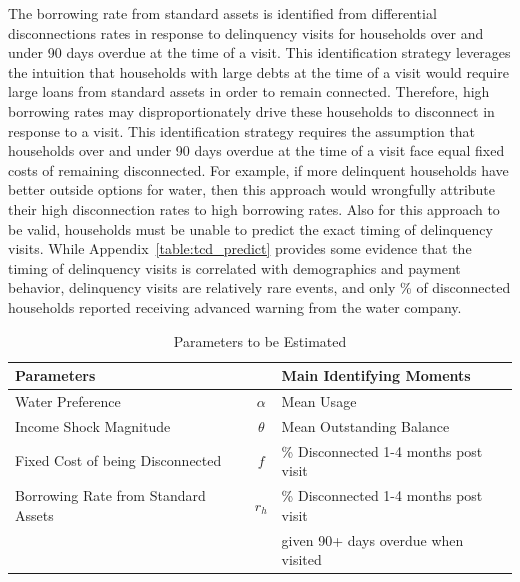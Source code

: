 \documentclass[12pt]{article}
\begin{document}
The borrowing rate from standard assets is identified from differential disconnections rates in response to delinquency visits for households over and under 90 days overdue at the time of a visit.  This identification strategy leverages the intuition that households with large debts at the time of a visit would require large loans from standard assets in order to remain connected.  Therefore, high borrowing rates may disproportionately drive these households to disconnect in response to a visit.  This identification strategy requires the assumption that households over and under 90 days overdue at the time of a visit face equal fixed costs of remaining disconnected.  For example, if more delinquent households have better outside options for water, then this approach would wrongfully attribute their high disconnection rates to high borrowing rates.  Also for this approach to be valid, households must be unable to predict the exact timing of delinquency visits.  While Appendix~\ref{table:tcd_predict} provides some evidence that the timing of delinquency visits is correlated with demographics and payment behavior, delinquency visits are relatively rare events, and only \unskip\% of disconnected households reported receiving advanced warning from the water company.

\begin{table}[H]
\centering
\caption{Parameters to be Estimated}\label{table:estimparam}
\vspace{-2mm}
\begin{tabular}{l*{1}{cl}}
\toprule
Parameters  &   & Main Identifying Moments  \\
\midrule
Water Preference  & $\alpha$ & Mean Usage \\[.1em]
Income Shock Magnitude & $\theta$ & Mean Outstanding Balance  \\[.1em]
Fixed Cost of being Disconnected  & $f$ &  \% Disconnected 1-4 months post visit \\[.1em]
Borrowing Rate from Standard Assets & $r_h$ & \% Disconnected 1-4 months post visit \\
 & & given 90+ days overdue when visited \\
\bottomrule
\end{tabular}
\end{table}
\end{document}
